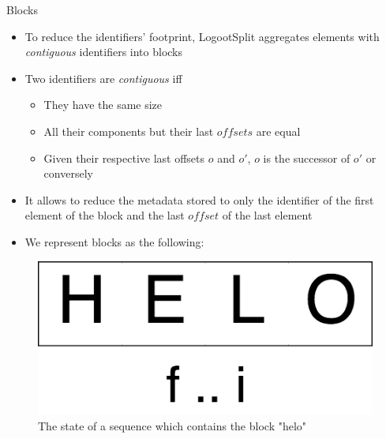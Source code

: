 \documentclass[10pt]{beamer}
\begin{document}
\begin{frame}{Blocks}

  \begin{itemize}
    \item To reduce the identifiers' footprint, LogootSplit aggregates elements with \emph{contiguous} identifiers into blocks
    \item Two identifiers are \emph{contiguous} iff
    \begin{itemize}
      \item They have the same size
      \item All their components but their last $offsets$ are equal
      \item Given their respective last offsets $o$ and $o'$, $o$ is the successor of $o'$ or conversely
    \end{itemize}
    \item It allows to reduce the metadata stored to only the identifier of the first element of the block and the last $offset$ of the last element
    \item We represent blocks as the following:
  \end{itemize}

  \begin{figure}
    \includegraphics[scale=0.15]{img/helo-as-block.png}
    \caption{The state of a sequence which contains the block "helo"}
  \end{figure}

\end{frame}
\end{document}
